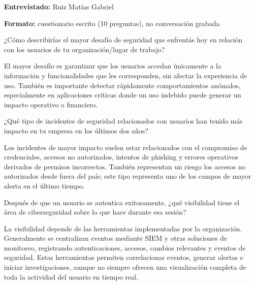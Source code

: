
\textbf{Entrevistado:} Ruiz Matías Gabriel

\textbf{Formato:} cuestionario escrito (10 preguntas), no conversación grabada

\begin{description}[leftmargin=0cm, labelsep=0.5cm]
    \item[\textbf{Pregunta 1:}] ¿Cómo describirías el mayor desafío de seguridad que enfrentás hoy en relación con los usuarios de tu organización/lugar de trabajo?

    \item[\textbf{RUIZ MATÍAS GABRIEL:}] El mayor desafío es garantizar que los usuarios accedan únicamente a la información y funcionalidades que les corresponden, sin afectar la experiencia de uso. También es importante detectar rápidamente comportamientos anómalos, especialmente en aplicaciones críticas donde un uso indebido puede generar un impacto operativo o financiero.

    \item[\textbf{Pregunta 2:}] ¿Qué tipo de incidentes de seguridad relacionados con usuarios han tenido más impacto en tu empresa en los últimos dos años?

    \item[\textbf{RUIZ MATÍAS GABRIEL:}] Los incidentes de mayor impacto suelen estar relacionados con el compromiso de credenciales, accesos no autorizados, intentos de phishing y errores operativos derivados de permisos incorrectos. También representan un riesgo los accesos no autorizados desde fuera del país; este tipo representa uno de los campos de mayor alerta en el último tiempo.

    \item[\textbf{Pregunta 3:}] Después de que un usuario se autentica exitosamente, ¿qué visibilidad tiene el área de ciberseguridad sobre lo que hace durante esa sesión?

    \item[\textbf{RUIZ MATÍAS GABRIEL:}] La visibilidad depende de las herramientas implementadas por la organización. Generalmente se centralizan eventos mediante SIEM y otras soluciones de monitoreo, registrando autenticaciones, accesos, cambios relevantes y eventos de seguridad. Estas herramientas permiten correlacionar eventos, generar alertas e iniciar investigaciones, aunque no siempre ofrecen una visualización completa de toda la actividad del usuario en tiempo real.


\end{description}
